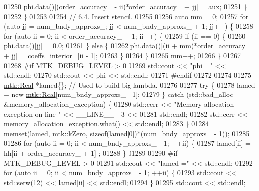 \begin{DoxyCode}
{{01250         phi.\hyperlink{classmtk_1_1DenseMatrix_a16b3ff56feb2658b9fc7147d1de4d8e7}{data}()[(order\_accuracy\_ - ii)*order\_accuracy\_ + jj] = aux;
01251       \}
01252     \}
01253 
01254     \textcolor{comment}{// 6.4. Insert stencil.}
01255 
01256     \textcolor{keyword}{auto} mm = 0;
01257     \textcolor{keywordflow}{for} (\textcolor{keyword}{auto} jj = num\_bndy\_approxs\_; jj < num\_bndy\_approxs\_ +  1; jj++) \{
01258       \textcolor{keywordflow}{for} (\textcolor{keyword}{auto} ii = 0; ii < order\_accuracy\_ + 1; ii++) \{
01259         \textcolor{keywordflow}{if} (ii == 0) \{
01260           phi.\hyperlink{classmtk_1_1DenseMatrix_a16b3ff56feb2658b9fc7147d1de4d8e7}{data}()[jj] = 0.0;
01261         \} \textcolor{keywordflow}{else} \{
01262           phi.\hyperlink{classmtk_1_1DenseMatrix_a16b3ff56feb2658b9fc7147d1de4d8e7}{data}()[(ii + mm)*order\_accuracy\_ + jj] = coeffs\_interior\_[ii - 1];
01263         \}
01264       \}
01265       mm++;
01266     \}
01267 
01268 \textcolor{preprocessor}{    #if MTK\_DEBUG\_LEVEL > 0}
01269     std::cout << \textcolor{stringliteral}{"phi ="} << std::endl;
01270     std::cout << phi << std::endl;
01271 \textcolor{preprocessor}{    #endif}
01272 
01274 
01275     \hyperlink{group__c01-roots_gac080bbbf5cbb5502c9f00405f894857d}{mtk::Real} *lamed\{\};  \textcolor{comment}{// Used to build big lambda.}
01276 
01277     \textcolor{keywordflow}{try} \{
01278       lamed = \textcolor{keyword}{new} \hyperlink{group__c01-roots_gac080bbbf5cbb5502c9f00405f894857d}{mtk::Real}[num\_bndy\_approxs\_ - 1];
01279     \} \textcolor{keywordflow}{catch} (std::bad\_alloc &memory\_allocation\_exception) \{
01280       std::cerr << \textcolor{stringliteral}{"Memory allocation exception on line "} << \_\_LINE\_\_ - 3 <<
01281         std::endl;
01282       std::cerr << memory\_allocation\_exception.what() << std::endl;
01283     \}
01284     memset(lamed, \hyperlink{group__c01-roots_ga59a451a5fae30d59649bcda274fea271}{mtk::kZero}, \textcolor{keyword}{sizeof}(lamed[0])*(num\_bndy\_approxs\_ - 1));
01285 
01286     \textcolor{keywordflow}{for} (\textcolor{keyword}{auto} ii = 0; ii < num\_bndy\_approxs\_ - 1; ++ii) \{
01287       lamed[ii] = hh[ii + order\_accuracy\_ + 1] ;
01288     \}
01289 
01290 \textcolor{preprocessor}{    #if MTK\_DEBUG\_LEVEL > 0}
01291     std::cout << \textcolor{stringliteral}{"lamed ="} << std::endl;
01292     \textcolor{keywordflow}{for} (\textcolor{keyword}{auto} ii = 0; ii < num\_bndy\_approxs\_ - 1; ++ii) \{
01293       std::cout << std::setw(12) << lamed[ii] << std::endl;
01294     \}
01295     std::cout << std::endl;
}}
\end{DoxyCode}

